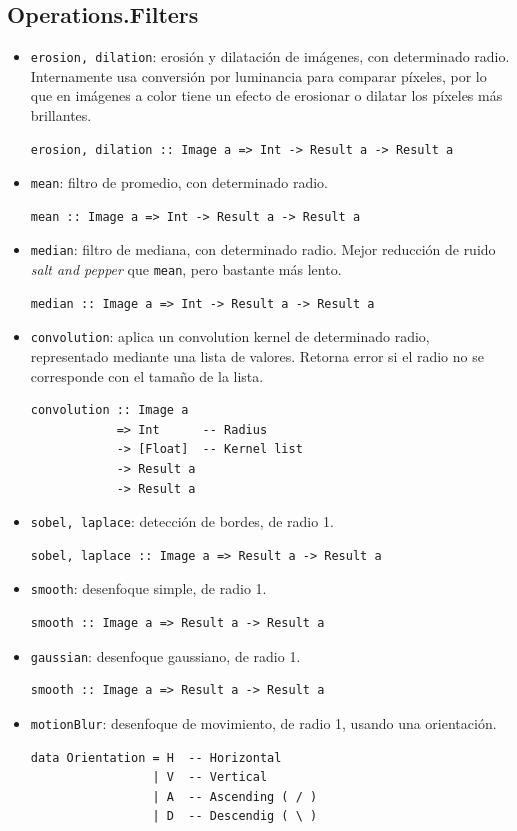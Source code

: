 \documentclass[a4paper, 11pt]{article} %
\begin{document}
\subsection*{Operations.Filters}
	\begin{itemize} 
		\item \texttt{erosion, dilation}: erosión y dilatación de imágenes, con determinado radio. Internamente usa conversión por luminancia para comparar píxeles, por lo que en imágenes a color tiene un efecto de erosionar o dilatar los píxeles más brillantes.
\begin{lstlisting}
erosion, dilation :: Image a => Int -> Result a -> Result a
\end{lstlisting}
		\item \texttt{mean}: filtro de promedio, con determinado radio.
\begin{lstlisting}
mean :: Image a => Int -> Result a -> Result a
\end{lstlisting}
		\item \texttt{median}: filtro de mediana, con determinado radio. Mejor reducción de ruido \textit{salt and pepper} que \texttt{mean}, pero bastante más lento. 
\begin{lstlisting}
median :: Image a => Int -> Result a -> Result a
\end{lstlisting}

		\item \texttt{convolution}: aplica un convolution kernel de determinado radio, representado mediante una lista de valores. Retorna error si el radio no se corresponde con el tamaño de la lista.
\begin{lstlisting}
convolution :: Image a 
            => Int      -- Radius
            -> [Float]  -- Kernel list
            -> Result a 
            -> Result a
\end{lstlisting}
		\item \texttt{sobel, laplace}: detección de bordes, de radio 1.
\begin{lstlisting}
sobel, laplace :: Image a => Result a -> Result a
\end{lstlisting}
		\item \texttt{smooth}: desenfoque simple, de radio 1.
\begin{lstlisting}
smooth :: Image a => Result a -> Result a
\end{lstlisting}
		\item \texttt{gaussian}: desenfoque gaussiano, de radio 1.
\begin{lstlisting}
smooth :: Image a => Result a -> Result a
\end{lstlisting}
		\item \texttt{motionBlur}: desenfoque de movimiento, de radio 1, usando una orientación. 
\begin{lstlisting}
data Orientation = H  -- Horizontal
                 | V  -- Vertical
                 | A  -- Ascending ( / )
                 | D  -- Descendig ( \ )


\end{lstlisting}
\end{itemize}
\end{document}
